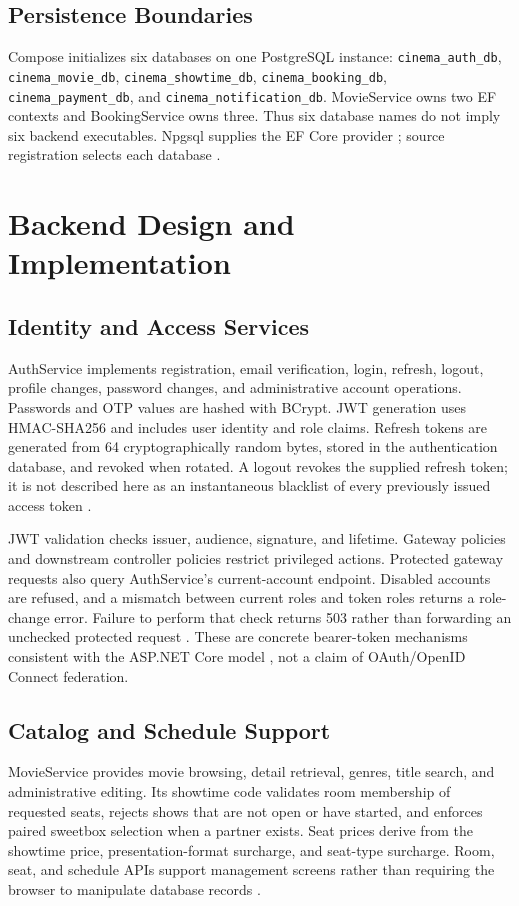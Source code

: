 \documentclass[conference]{IEEEtran}
\newcommand{\code}[1]{\texttt{#1}}
\begin{document}
\subsection{Persistence Boundaries}
Compose initializes six databases on one PostgreSQL instance:
\code{cinema\_auth\_db}, \code{cinema\_movie\_db},
\code{cinema\_showtime\_db}, \code{cinema\_booking\_db},
\code{cinema\_payment\_db}, and \code{cinema\_notification\_db}.
MovieService owns two EF contexts and BookingService owns three. Thus six
database names do not imply six backend executables. Npgsql supplies the EF
Core provider \cite{npgsql}; source registration selects each database
\cite{auth,movie,booking,deployment}.

\section{Backend Design and Implementation}
\subsection{Identity and Access Services}
AuthService implements registration, email verification, login, refresh,
logout, profile changes, password changes, and administrative account operations.
Passwords and OTP values are hashed with BCrypt. JWT generation uses
HMAC-SHA256 and includes user identity and role claims. Refresh tokens are
generated from 64 cryptographically random bytes, stored in the authentication
database, and revoked when rotated. A logout revokes the supplied refresh token;
it is not described here as an instantaneous blacklist of every previously
issued access token \cite{auth}.

JWT validation checks issuer, audience, signature, and lifetime. Gateway policies
and downstream controller policies restrict privileged actions. Protected
gateway requests also query AuthService's current-account endpoint. Disabled
accounts are refused, and a mismatch between current roles and token roles
returns a role-change error. Failure to perform that check returns 503 rather
than forwarding an unchecked protected request \cite{gateway}. These are
concrete bearer-token mechanisms consistent with the ASP.NET Core model
\cite{jwt}, not a claim of OAuth/OpenID Connect federation.

\subsection{Catalog and Schedule Support}
MovieService provides movie browsing, detail retrieval, genres, title search,
and administrative editing. Its showtime code validates room membership of
requested seats, rejects shows that are not open or have started, and enforces
paired sweetbox selection when a partner exists. Seat prices derive from the
showtime price, presentation-format surcharge, and seat-type surcharge.
Room, seat, and schedule APIs support management screens rather than requiring
the browser to manipulate database records \cite{movie,webui}.
\end{document}
